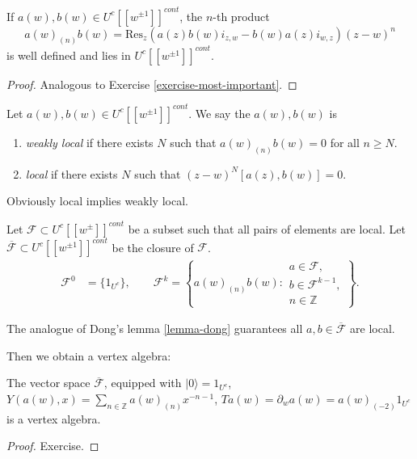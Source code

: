 \begin{proposition}
\label{proposition-}
If $a(w),b(w)\in U^c[[w^{\pm 1}]]^{cont}$,
the $n$-th product
 $$
a(w)_{(n)}b(w)
=\text{Res}_z(a(z)b(w)i_{z,w}-b(w)a(z)i_{w,z})(z-w)^n
$$
is well defined and lies in $U^c[[w^{\pm 1}]]^{cont}$.
\end{proposition}

\begin{proof}
Analogous to Exercise \ref{exercise-most-important}.
\end{proof}

\begin{definition}
\label{definition-local}
Let $a(w),b(w) \in U^c[[w^{\pm 1}]]^{cont}$.
We say the $a(w),b(w)$ is
 \begin{enumerate}
\item {\it weakly local} if there exists  $N$ such that
$a(w)_{(n)}b(w)=0$ for all $n \geq N$.
\item {\it local} if there exists $N$ such that
$(z-w)^N[a(z),b(w)]=0$.
\end{enumerate}
\end{definition}

\noindent
Obviously local implies weakly local.

Let $\mathcal{F}\subset U^c[[w^{\pm}]]^{cont}$ be a subset such that
all pairs of elements are local.
Let $\overline{\mathcal{F}}\subset U^c[[w^{\pm 1}]]^{cont}$ be the
closure of $\mathcal{F}$.
 \begin{align*}
\mathcal{F}^0&=\{1_{U^c}\},\qquad 
\mathcal{F}^k=\left\{a(w)_{(n)}b(w):\substack{a \in \mathcal{F}, \\
b \in \mathcal{F}^{k-1}, \\
n \in \mathbb{Z}}\right\}.
\end{align*}

\noindent
The analogue of Dong's lemma \ref{lemma-dong} guarantees all
$a,b \in \overline{\mathcal{F}}$ are local.

Then we obtain a vertex algebra:

\begin{theorem}
\label{theorem-vertex-algebra-continuous}
The vector space $\overline{\mathcal{F}}$, equipped with
$|0\rangle=1_{U^c}$,
$Y(a(w),x)=\sum_{n \in \mathbb{Z}}a(w)_{(n)}x^{-n-1}$,
$Ta(w)=\partial_wa(w)=a(w)_{(-2)}1_{U^c}$ is a vertex algebra.
\end{theorem}

\begin{proof}
Exercise.
\end{proof}

